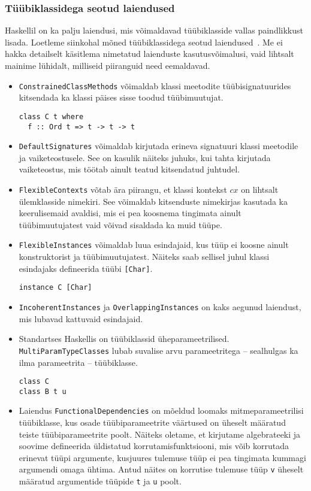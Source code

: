 \documentclass[12pt]{article}
\begin{document}
      \subsubsection{Tüübiklassidega seotud laiendused}
        Haskellil on ka palju laiendusi, mis võimaldavad tüübiklasside vallas paindlikkust lisada. Loetleme siinkohal mõned tüübiklassidega seotud laiendused~\cite{Gla}. Me ei hakka detailselt käsitlema nimetatud laienduste kasutusvõimalusi, vaid lihtsalt mainime lühidalt, milliseid piiranguid need eemaldavad.

        \begin{itemize}
          \item
            \verb!ConstrainedClassMethods! võimaldab klassi meetodite tüübisignatuurides kitsendada ka klassi päises sisse toodud tüübimuutujat.

            \begin{verbatim}class C t where
  f :: Ord t => t -> t -> t\end{verbatim}
          \item
            \verb!DefaultSignatures! võimaldab kirjutada erineva signatuuri klassi meetodile ja vaiketeostusele. See on kasulik näiteks juhuks, kui tahta kirjutada vaiketeostus, mis töötab ainult teatud kitsendatud juhtudel.
          \item
            \verb!FlexibleContexts! võtab ära piirangu, et klassi kontekst $cx$ on lihtsalt ülemklasside nimekiri. See võimaldab kitsenduste nimekirjas kasutada ka keerulisemaid avaldisi, mis ei pea koosnema tingimata ainult tüübimuutujatest vaid võivad sisaldada ka muid tüüpe.
          \item
            \verb!FlexibleInstances! võimaldab luua esindajaid, kus tüüp ei koosne ainult konstruktorist ja tüübimuutujatest. Näiteks saab sellisel juhul klassi esindajaks defineerida tüübi \verb![Char]!.

            \begin{verbatim}instance C [Char]\end{verbatim}
          \item
            \verb!IncoherentInstances! ja \verb!OverlappingInstances! on kaks aegunud laiendust, mis lubavad kattuvaid esindajaid.
          \item
            Standartses Haskellis on tüübiklassid üheparameetrilised. \verb!MultiParamTypeClasses! lubab suvalise arvu parameetritega -- sealhulgas ka ilma parameetrita -- tüübiklasse.

            \begin{verbatim}
class C
class B t u\end{verbatim}
          \item
            Laiendus \verb!FunctionalDependencies! on mõeldud loomaks mitmeparameetrilisi tüübiklasse, kus osade tüübiparameetrite väärtused on üheselt määratud teiste tüübiparameetrite poolt. Näiteks oletame, et kirjutame algebrateeki ja soovime defineerida üldistatud korrutamisfunktsiooni, mis võib korrutada erinevat tüüpi argumente, kusjuures tulemuse tüüp ei pea tingimata kummagi argumendi omaga ühtima. Antud näites on korrutise tulemuse tüüp \verb!v! üheselt määratud argumentide tüüpide \verb!t! ja \verb!u! poolt.


\end{itemize}
\end{document}
